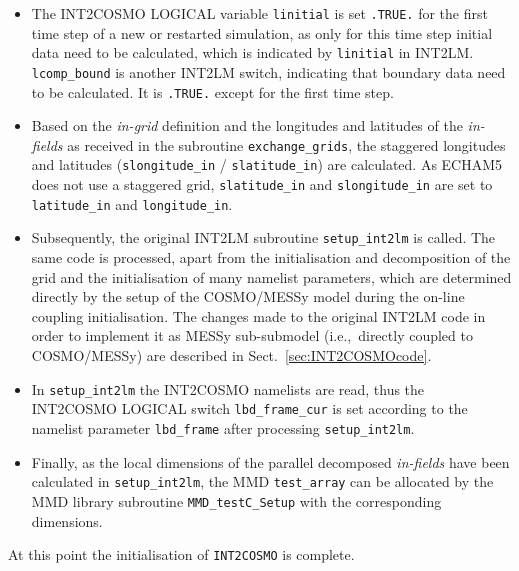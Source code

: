 \documentclass[11pt,twoside]{article}
\begin{document}
\begin{itemize}
\begin{itemize}
\item The INT2COSMO {\footnotesize LOGICAL} variable \verb|linitial| is set 
\verb|.TRUE.| for the first time step of a new or restarted
simulation, as only for this 
time step initial data need to be calculated, which is indicated by 
\verb|linitial| in INT2LM. \verb|lcomp_bound| is another INT2LM switch, 
indicating that boundary data need to be calculated. It is \verb|.TRUE.| except 
for the first time step.

\item Based on the {\it in-grid} definition and the longitudes and latitudes 
of the {\it in-fields}
as received in the subroutine \verb|exchange_grids|, the staggered  longitudes
and latitudes 
(\verb|slongitude_in| / \verb|slatitude_in|) are calculated.
As ECHAM5 does not use a staggered grid, \verb|slatitude_in| and 
\verb|slongitude_in| are set to \verb|latitude_in| and \verb|longitude_in|.

\item Subsequently, the original INT2LM subroutine \verb|setup_int2lm|
is called. 
The same code is processed, apart from the initialisation and decomposition of 
the grid and the initialisation of many namelist parameters, which are determined
 directly by the setup of the COSMO/MESSy model during the on-line coupling
initialisation.
The changes made to the original INT2LM code in order to implement it as
MESSy sub-submodel (i.e.,\ directly coupled to COSMO/MESSy) are described in 
Sect.\ \ref{sec:INT2COSMOcode}.

\item In \verb|setup_int2lm| the INT2COSMO namelists are read, thus
the INT2COSMO {\footnotesize LOGICAL }switch \verb|lbd_frame_cur| is set 
according to the namelist parameter \verb|lbd_frame| after processing 
\verb|setup_int2lm|.

\item Finally, as the local dimensions of the parallel decomposed
{\it in-fields} have been calculated in \verb|setup_int2lm|, the
 MMD \verb|test_array| can be allocated by the MMD library
 subroutine \verb|MMD_testC_Setup| with the corresponding dimensions.
\end{itemize}%

At this point the initialisation of \verb|INT2COSMO| is complete.


\end{itemize}
\end{document}
